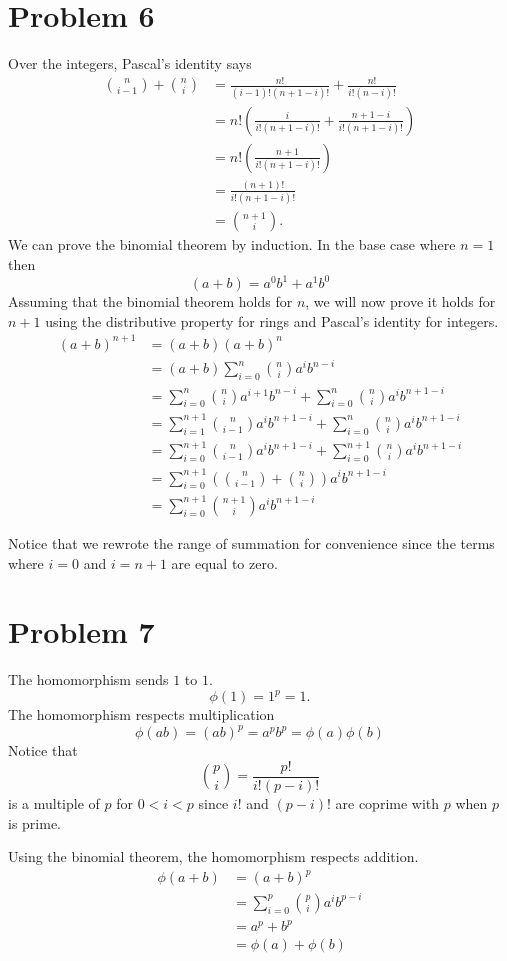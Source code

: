 \documentclass{article}
\begin{document}
\section*{Problem 6}
Over the integers, Pascal's identity says
\begin{align*}
	\binom{n}{i-1} + \binom{n}{i} &=\frac{n!}{(i-1)!(n+1-i)!}+\frac{n!}{i!(n-i)!} \\
	&= n!\left(\frac{i}{i!(n+1-i)!}+\frac{n+1-i}{i!(n+1-i)!}\right) \\
	&= n!\left(\frac{n+1}{i!(n+1-i)!}\right) \\ 
	&= \frac{(n+1)!}{i!(n+1-i)!} \\ 
	&= \binom{n+1}{i}.
\end{align*}
We can prove the binomial theorem by induction.
In the base case where $n=1$ then
\[
	(a+b) = a^0b^1 + a^1b^0
\]
Assuming that the binomial theorem holds for $n$,
we will now prove it holds for $n+1$
using the distributive property for rings and Pascal's identity for integers.
\begin{align*}
	(a+b)^{n+1} &= (a+b)(a+b)^n \\
	&= (a+b)\sum_{i=0}^{n} \binom{n}{i} a^i b^{n-i} \\
	&= \sum_{i=0}^{n} \binom{n}{i} a^{i+1} b^{n-i} + \sum_{i=0}^{n} \binom{n}{i} a^i b^{n+1-i} \\
	&= \sum_{i=1}^{n+1} \binom{n}{i-1} a^{i} b^{n+1-i} + \sum_{i=0}^{n} \binom{n}{i} a^i b^{n+1-i} \\
	&= \sum_{i=0}^{n+1} \binom{n}{i-1} a^{i} b^{n+1-i} + \sum_{i=0}^{n+1} \binom{n}{i} a^i b^{n+1-i} \\
	&= \sum_{i=0}^{n+1} \left( \binom{n}{i-1} +\binom{n}{i}\right)a^{i} b^{n+1-i}\\
	&= \sum_{i=0}^{n+1} \binom{n+1}{i} a^{i} b^{n+1-i}
\end{align*}

Notice that we rewrote the range of summation for convenience 
since the terms where $i=0$ and $i=n+1$ are equal to zero.
\newpage 

\section*{Problem 7}
The homomorphism sends $1$ to $1$.
\[
	\phi(1) = 1^p = 1.
\]
The homomorphism respects multiplication
\[
	\phi(ab) = (ab)^p = a^pb^p = \phi(a)\phi(b)
\]
Notice that 
\[
	\binom{p}{i} = \frac{p!}{i!(p-i)!}
\]
is a multiple of $p$ for $0<i<p$
since $i!$ and $(p-i)!$ are coprime with $p$ when $p$ is prime.

Using the binomial theorem, the homomorphism respects addition.
\begin{align*}
	\phi(a+b) &= (a+b)^p \\
	 &= \sum_{i=0}^{p} \binom{p}{i} a^i b^{p-i} \\
	 &= a^p + b^p \\
	 &= \phi(a) + \phi(b)
\end{align*}
\end{document}
